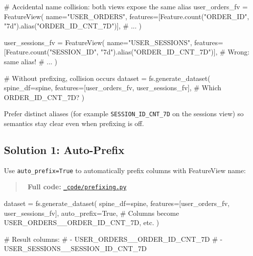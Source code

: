 \documentclass[
  letterpaper,
  DIV=11,
  numbers=noendperiod]{scrreprt}
\newenvironment{Shaded}{\begin{snugshade}}{\end{snugshade}}
\newcommand{\CommentTok}[1]{\textcolor[rgb]{0.37,0.37,0.37}{#1}}
\newcommand{\NormalTok}[1]{\textcolor[rgb]{0.00,0.23,0.31}{#1}}
\newcommand{\OperatorTok}[1]{\textcolor[rgb]{0.37,0.37,0.37}{#1}}
\newcommand{\StringTok}[1]{\textcolor[rgb]{0.13,0.47,0.30}{#1}}
\newcommand{\VariableTok}[1]{\textcolor[rgb]{0.07,0.07,0.07}{#1}}
\begin{document}
\begin{Shaded}
\begin{Highlighting}[]
\CommentTok{\# Accidental name collision: both views expose the same alias}
\NormalTok{user\_orders\_fv }\OperatorTok{=}\NormalTok{ FeatureView(}
\NormalTok{    name}\OperatorTok{=}\StringTok{"USER\_ORDERS"}\NormalTok{,}
\NormalTok{    features}\OperatorTok{=}\NormalTok{[Feature.count(}\StringTok{"ORDER\_ID"}\NormalTok{, }\StringTok{"7d"}\NormalTok{).alias(}\StringTok{"ORDER\_ID\_CNT\_7D"}\NormalTok{)],}
    \CommentTok{\# ...}
\NormalTok{)}

\NormalTok{user\_sessions\_fv }\OperatorTok{=}\NormalTok{ FeatureView(}
\NormalTok{    name}\OperatorTok{=}\StringTok{"USER\_SESSIONS"}\NormalTok{,}
\NormalTok{    features}\OperatorTok{=}\NormalTok{[Feature.count(}\StringTok{"SESSION\_ID"}\NormalTok{, }\StringTok{"7d"}\NormalTok{).alias(}\StringTok{"ORDER\_ID\_CNT\_7D"}\NormalTok{)],  }\CommentTok{\# Wrong: same alias!}
    \CommentTok{\# ...}
\NormalTok{)}

\CommentTok{\# Without prefixing, collision occurs}
\NormalTok{dataset }\OperatorTok{=}\NormalTok{ fs.generate\_dataset(}
\NormalTok{    spine\_df}\OperatorTok{=}\NormalTok{spine,}
\NormalTok{    features}\OperatorTok{=}\NormalTok{[user\_orders\_fv, user\_sessions\_fv],  }\CommentTok{\# Which ORDER\_ID\_CNT\_7D?}
\NormalTok{)}
\end{Highlighting}
\end{Shaded}

Prefer distinct aliases (for example \texttt{SESSION\_ID\_CNT\_7D} on
the sessions view) so semantics stay clear even when prefixing is off.

\hypertarget{solution-1-auto-prefix}{%
\subsection{Solution 1: Auto-Prefix}\label{solution-1-auto-prefix}}

Use \texttt{auto\_prefix=True} to automatically prefix columns with
FeatureView name:

\begin{quote}
📁 \textbf{Full code:}
\href{_code/prefixing.py}{\texttt{\_code/prefixing.py}}
\end{quote}

\begin{Shaded}
\begin{Highlighting}[]
\NormalTok{dataset }\OperatorTok{=}\NormalTok{ fs.generate\_dataset(}
\NormalTok{    spine\_df}\OperatorTok{=}\NormalTok{spine,}
\NormalTok{    features}\OperatorTok{=}\NormalTok{[user\_orders\_fv, user\_sessions\_fv],}
\NormalTok{    auto\_prefix}\OperatorTok{=}\VariableTok{True}\NormalTok{,  }\CommentTok{\# Columns become USER\_ORDERS\_\_ORDER\_ID\_CNT\_7D, etc.}
\NormalTok{)}

\CommentTok{\# Result columns:}
\CommentTok{\# {-} USER\_ORDERS\_\_ORDER\_ID\_CNT\_7D}
\CommentTok{\# {-} USER\_SESSIONS\_\_SESSION\_ID\_CNT\_7D}
\end{Highlighting}
\end{Shaded}
\end{document}
